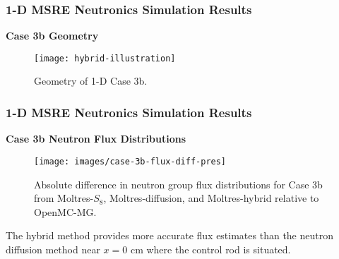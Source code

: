\begin{frame}
  \frametitle{1-D MSRE Neutronics Simulation Results}
  \textbf{Case 3b Geometry}
  \begin{figure}
    \centering
    \texttt{[image: hybrid-illustration]}
    \caption{Geometry of 1-D Case 3b.}
  \end{figure}
\end{frame}

\begin{frame}
  \frametitle{1-D MSRE Neutronics Simulation Results}
  \textbf{Case 3b Neutron Flux Distributions}
  \begin{figure}[htb!]
    \centering
    \texttt{[image: images/case-3b-flux-diff-pres]}
    \caption{Absolute difference in neutron group flux distributions for Case 3b from Moltres-$S_8$,
    Moltres-diffusion, and Moltres-hybrid relative to OpenMC-MG.}
    \label{fig:3b-flux-diff}
  \end{figure}
    The hybrid method provides more accurate flux estimates than the neutron diffusion method near $x=0$ cm where
      the control rod is situated.
\end{frame}


